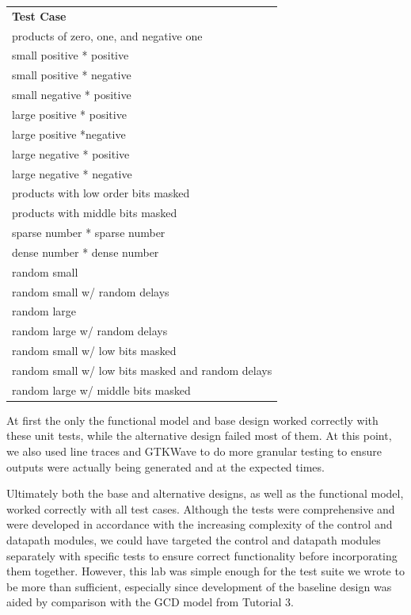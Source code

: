 \documentclass[11pt]{article}
\begin{document}
\begin{table}[h]
\begin{tabular}{l}
\textbf{Test Case}                                \\
products of zero, one, and negative one           \\
small positive * positive                         \\
small positive * negative                         \\
small negative * positive                         \\
large positive * positive                         \\
large positive *negative                          \\
large negative * positive                         \\
large negative * negative                         \\
products with low order bits masked               \\
products with middle bits masked                  \\
sparse number * sparse number                     \\
dense number * dense number                       \\
random small                                      \\
random small w/ random delays                     \\
random large                                      \\
random large w/ random delays                     \\
random small w/ low bits masked                   \\
random small w/ low bits masked and random delays \\
random large w/ middle bits masked                \\
                                                 
\end{tabular}
\end{table}
\caption{}

At first the only the functional model and base design worked correctly with these unit tests, while the alternative design failed most of them. At this point, we also used line traces and GTKWave to do more granular testing to ensure outputs were actually being generated and at the expected times. 

Ultimately both the base and alternative designs, as well as the functional model, worked correctly with all test cases. Although the tests were comprehensive and were developed in accordance with the increasing complexity of the control and datapath modules, we could have targeted the control and datapath modules separately with specific tests to ensure correct functionality before incorporating them together. However, this lab was simple enough for the test suite we wrote to be more than sufficient, especially since development of the baseline design was aided by comparison with the GCD model from Tutorial 3. 
\end{document}
